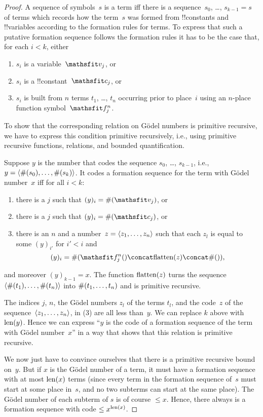 \documentclass[../../include/open-logic-section]{subfiles}
\begin{document}
\begin{proof}
A sequence of symbols~$s$ is a term iff there is a sequence~$s_0$,
\dots, $s_{k-1} = s$ of terms which records how the term~$s$ was formed
from !!{constant}s and !!{variable}s according to the formation rules
for terms. To express that such a putative formation sequence follows
the formation rules it has to be the case that, for each $i < k$, either
\begin{enumerate}
\item $s_i$ is a variable~$\Obj v_j$, or
\item $s_i$ is a !!{constant}~$\Obj c_j$, or
\item $s_i$ is built from $n$ terms $t_1$, \dots, $t_n$ occurring
  prior to place~$i$ using an $n$-place function symbol~$\Obj f^n_j$.
\end{enumerate}
To show that the corresponding relation on G\"odel numbers is
primitive recursive, we have to express this condition primitive
recursively, i.e., using primitive recursive functions, relations, and
bounded quantification.

Suppose $y$ is the number that codes the sequence $s_0$, \dots, $s_{k-1}$,
i.e., $y = \langle \#(s_0), \dots, \#(s_k) \rangle$.  It codes a formation
sequence for the term with G\"odel number~$x$ iff for all $i < k$:
\begin{enumerate}
\item there is a $j$ such that $(y)_i = \Gn{\Obj v_j}$, or
\item there is a $j$ such that $(y)_i = \Gn{\Obj c_j}$, or
\item there is an $n$ and a number~$z = \langle z_1, \dots, z_n \rangle$ such
  that each $z_l$ is equal to some $(y)_{i'}$ for $i' < i$ and
\[
(y)_i = \Gn{\Obj f^n_j(} \concat \fn{flatten}(z) \concat \Gn{)},
\]
\end{enumerate}
and moreover $(y)_{k-1} = x$.  The function
$\mathrm{flatten}(z)$ turns the sequence $\langle \#(t_1), \dots,
  \#(t_n) \rangle$ into $\#(t_1, \dots, t_n)$ and is primitive recursive.

The indices $j$, $n$, the G\"odel numbers $z_l$ of the terms $t_l$,
and the code~$z$ of the sequence~$\langle z_1, \dots, z_n \rangle$, in (3) are
all less than~$y$.  We can replace $k$ above with $\mathrm{len}(y)$.  Hence we
can express ``$y$ is the code of a formation sequence of the term with
G\"odel number~$x$'' in a way that shows that this relation is
primitive recursive.

We now just have to convince ourselves that there is a primitive
recursive bound on~$y$.  But if $x$ is the G\"odel number of a term,
it must have a formation sequence with at most $\mathrm{len}(x)$ terms (since
every term in the formation sequence of~$s$ must start at some place
in~$s$, and no two subterms can start at the same place).  The G\"odel
number of each subterm of $s$ is of course $\le x$.  Hence, there
always is a formation sequence with code $\le x^{\mathrm{len}(x)}$.
\end{proof}
\end{document}
